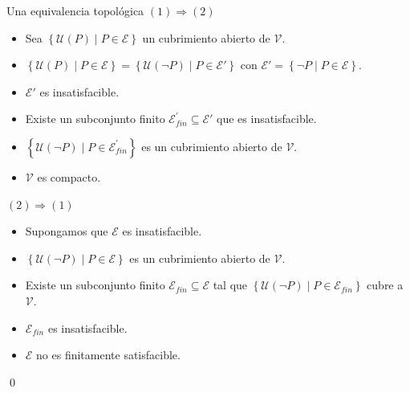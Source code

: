 \begin{frame}{Una equivalencia topológica}
   \alert{$(1)\Rightarrow (2)$}
   \begin{itemize}
      \item Sea $\left\lbrace \mathcal{U}(P)\mid P\in \mathcal{E}\right\rbrace$ un cubrimiento abierto de $\mathcal{V}$.
      \item <2-> $\left\lbrace \mathcal{U}(P)\mid P\in \mathcal{E}\right\rbrace=\left\lbrace \mathcal{U}(\neg P)\mid P\in \mathcal{E}'\right\rbrace$ con $\mathcal{E}'=\left\lbrace \neg P \mid P\in \mathcal{E}\right\rbrace$.
      \item <3-> $\mathcal{E}'$ es insatisfacible.
      \item <4-> Existe un subconjunto finito $\mathcal{E}^{'}_{fin}\subseteq \mathcal{E}'$ que es insatisfacible.
      \item <5-> $\left\lbrace \mathcal{U}(\neg P)\mid P\in \mathcal{E}^{'}_{fin}\right\rbrace$ es un cubrimiento abierto de $\mathcal{V}$.
      \item <6-> $\mathcal{V}$ es compacto.
   \end{itemize}
\end{frame}
\begin{frame}
   \alert{$(2)\Rightarrow (1)$}
   \begin{itemize}
      \item Supongamos que $\mathcal{E}$ es insatisfacible.
      \item <2-> $\left\lbrace \mathcal{U}(\neg P)\mid P\in \mathcal{E}\right\rbrace$ es un cubrimiento abierto de $\mathcal{V}$.
      \item <3-> Existe un subconjunto finito $\mathcal{E}_{fin}\subseteq \mathcal{E}$ tal que $\left\lbrace \mathcal{U}(\neg P)\mid P\in \mathcal{E}_{fin}\right\rbrace$ cubre a $\mathcal{V}$.
      \item <4-> $\mathcal{E}_{fin}$ es insatisfacible.
      \item <5-> $\mathcal{E}$ no es finitamente satisfacible.
   \end{itemize}
   \hfill \qed
\end{frame}

